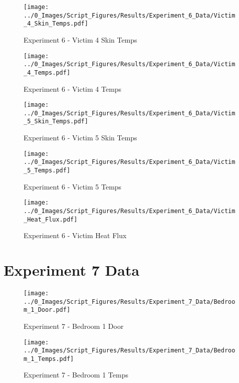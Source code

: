 	\clearpage

	\begin{figure}[H]
		\centering
		\texttt{[image: ../0\_Images/Script\_Figures/Results/Experiment\_6\_Data/Victim\_4\_Skin\_Temps.pdf]}
		\caption[]{Experiment 6 - Victim 4 Skin Temps}
	\end{figure}
 

	\begin{figure}[H]
		\centering
		\texttt{[image: ../0\_Images/Script\_Figures/Results/Experiment\_6\_Data/Victim\_4\_Temps.pdf]}
		\caption[]{Experiment 6 - Victim 4 Temps}
	\end{figure}
 
	\clearpage

	\begin{figure}[H]
		\centering
		\texttt{[image: ../0\_Images/Script\_Figures/Results/Experiment\_6\_Data/Victim\_5\_Skin\_Temps.pdf]}
		\caption[]{Experiment 6 - Victim 5 Skin Temps}
	\end{figure}
 

	\begin{figure}[H]
		\centering
		\texttt{[image: ../0\_Images/Script\_Figures/Results/Experiment\_6\_Data/Victim\_5\_Temps.pdf]}
		\caption[]{Experiment 6 - Victim 5 Temps}
	\end{figure}
 
	\clearpage

	\begin{figure}[H]
		\centering
		\texttt{[image: ../0\_Images/Script\_Figures/Results/Experiment\_6\_Data/Victim\_Heat\_Flux.pdf]}
		\caption[]{Experiment 6 - Victim Heat Flux}
	\end{figure}
 

\clearpage		\large
\section{Experiment 7 Data} \label{App:Exp7Results} 

	\begin{figure}[H]
		\centering
		\texttt{[image: ../0\_Images/Script\_Figures/Results/Experiment\_7\_Data/Bedroom\_1\_Door.pdf]}
		\caption[]{Experiment 7 - Bedroom 1 Door}
	\end{figure}
 

	\begin{figure}[H]
		\centering
		\texttt{[image: ../0\_Images/Script\_Figures/Results/Experiment\_7\_Data/Bedroom\_1\_Temps.pdf]}
		\caption[]{Experiment 7 - Bedroom 1 Temps}
	\end{figure}
 
